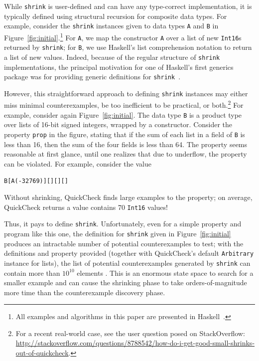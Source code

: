 \documentclass[10pt]{sigplanconf}
\newenvironment{code}{\begin{alltt}}{\end{alltt}}
\newcommand{\ttp}[1]{\texttt{#1}}
\begin{document}
While \ttp{shrink} is user-defined and can have any type-correct implementation,
it is typically defined using structural recursion for composite data types.
For example, consider the \ttp{shrink} instances given to data types \ttp{A} and
\ttp{B} in Figure~\ref{fig:initial}.\footnote{All examples and algorithms in
  this paper are presented in Haskell~\cite{haskell98}.}  For \ttp{A}, we map
the constructor \ttp{A} over a list of new \ttp{Int16}s returned by
\ttp{shrink}; for \ttp{B}, we use Haskell's list comprehension notation to
return a list of new values.  Indeed, because of the regular structure of
\ttp{shrink} implementations, the principal motivation for one of Haskell's
first generics package was for providing generic definitions for
\ttp{shrink}~\cite{syb}.

However, this straightforward approach to defining \ttp{shrink} instances may
either miss minimal counterexamples, be too inefficient to be practical, or
both.\footnote{For a recent real-world case, see the user question posed on
  StackOverflow:
  \url{http://stackoverflow.com/questions/8788542/how-do-i-get-good-small-shrinks-out-of-quickcheck}.}
For example, consider again Figure~\ref{fig:initial}.  The data type \ttp{B} is
a product type over lists of 16-bit signed integers, wrapped by a constructor.
Consider the property \ttp{prop} in the figure, stating that if the sum of each
list in a field of \ttp{B} is less than 16, then the sum of the four fields is
less than 64.  The property seems reasonable at first glance, until
one realizes that due to underflow, the property can be violated.  For example,
consider the value
%
\begin{code}
B [A (-32769)] [] [] []
\end{code}
%
\noindent
Without shrinking, QuickCheck finds large examples to the property; on average,
QuickCheck returns a value contains 70 \ttp{Int16} values!

Thus, it pays to define \ttp{shrink}.  Unfortunately, even for a simple property
and program like this one, the definition for \ttp{shrink} given in
Figure~\ref{fig:initial} produces an intractable number of potential
counterexamples to test; with the definitions and property provided (together
with QuickCheck's default \ttp{Arbitrary} instance for lists), the list of
potential counterexamples generated by \ttp{shrink} can contain more than
$10^{10}$ elements .  This is an enormous state space to search for a smaller
example and can cause the shrinking phase to take orders-of-magnitude more time
than the counterexample discovery phase.
\end{document}

